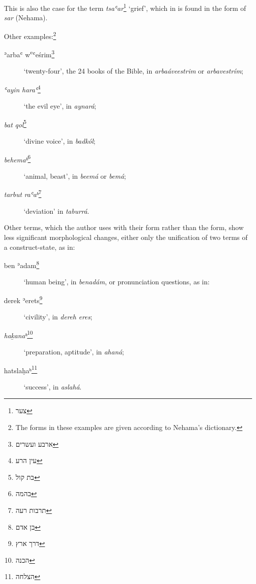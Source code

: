 \documentclass[output=paper,colorlinks,citecolor=brown,babel,arabicfont]{langscibook}
\begin{document}
This is also the case for the term \textit{tsaʿar}\footnote{\texthebrew{צער}} `grief', which in  is found in the form of \textit{sar} (Nehama).

Other examples:\footnote{The  forms in these examples are given according to Nehama's dictionary.}

\begin{description}
 \item[{ʾarbaʿ w\textsuperscript{e}ʿeśrim}\footnote{\texthebrew{ארבע ועשרים}}] `twenty-four', the 24 books of the Bible, in  \textit{arbaáveestrim} or \textit{arbavestrím};

\item[\textit{ʿayin haraʿ}\footnote{\texthebrew{עין הרע}}] `the evil eye', in  \textit{aynará};

\item[\textit{bat qol}\footnote{\texthebrew{בת קול}}] `divine voice', in  \textit{badkól};

\item[\textit{behemaʰ}\footnote{\texthebrew{בהמה}}] `animal, beast', in  \textit{beemá} or \textit{bemá};

\item[\textit{tarbut raʿaʰ}\footnote{\texthebrew{תרבות רעה}}] `deviation' in  \textit{taburrá}.
\end{description}

Other terms, which the author uses with their  form rather than the  form, show less significant morphological changes, either only the unification of two terms of a construct-state, as in:

\begin{description}

\item[{ben ʾadam}\footnote{\texthebrew{בן אדם}}] `human being', in  \textit{benadám}, or pronunciation questions, as in:

\item[{derek ʾerets}\footnote{\texthebrew{דרך ארץ}}] `civility', in  \textit{dereh eres};

\item[\textit{ha\b{k}anaʰ}\footnote{\texthebrew{הכנה}}] `preparation, aptitude', in  \textit{ahaná};

\item[{hatslaḥaʰ}\footnote{\texthebrew{הצלחה}}] `success', in  \textit{aslahá}.
\end{description}
\end{document}
